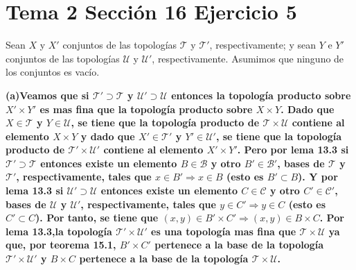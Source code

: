 \documentclass{article}
\begin{document}
\section{Tema 2 Sección 16 Ejercicio 5}
Sean $X$ y $X'$ conjuntos de las topologías $\mathcal{T}$ y $\mathcal{T}'$, respectivamente; y  sean $Y$ e $Y'$ conjuntos de las topologías $\mathcal{U}$ y $\mathcal{U}'$, respectivamente. Asumimos que ninguno de los conjuntos es vacío.

\bf(a)\rm Veamos que si $\mathcal{T}'\supset\mathcal{T}$ y $\mathcal{U}'\supset\mathcal{U}$ entonces la topología producto sobre $X'\times Y'$ es mas fina que la topología producto sobre $X\times Y$. Dado que $X\in \mathcal{T}$ y $Y\in \mathcal{U}$, se tiene que la topología producto de $\mathcal{T}\times\mathcal{U}$ contiene al elemento $X\times Y$ y dado que $X'\in \mathcal{T}'$ y $Y'\in \mathcal{U}'$, se tiene que la topología producto de $\mathcal{T}'\times\mathcal{U}'$ contiene al elemento $X'\times Y'$. Pero por lema 13.3 si $\mathcal{T}'\supset\mathcal{T}$ entonces existe un elemento $B\in \mathcal{B}$ y otro $B'\in \mathcal{B}'$, bases de $\mathcal{T}$ y $\mathcal{T}'$, respectivamente, tales que $x\in B' \Rightarrow x\in B$ (esto es $B'\subset B$). Y por lema 13.3 si $\mathcal{U}'\supset\mathcal{U}$ entonces existe un elemento $C\in \mathcal{C}$ y otro $C'\in \mathcal{C}'$, bases de $\mathcal{U}$ y $\mathcal{U}'$, respectivamente, tales que $y\in C' \Rightarrow y\in C$ (esto es $C'\subset C$). Por tanto, se tiene que $(x,y)\in B'\times C' \Rightarrow (x,y)\in B\times C$. Por lema 13.3,la topología $\mathcal{T}'\times \mathcal{U}'$ es una topología mas fina que $\mathcal{T}\times \mathcal{U}$ ya que, por teorema 15.1, $B'\times C'$ pertenece a la base de la topología $\mathcal{T}'\times \mathcal{U}'$ y $B\times C$ pertenece a la base de la topología $\mathcal{T}\times \mathcal{U}$.
\end{document}
